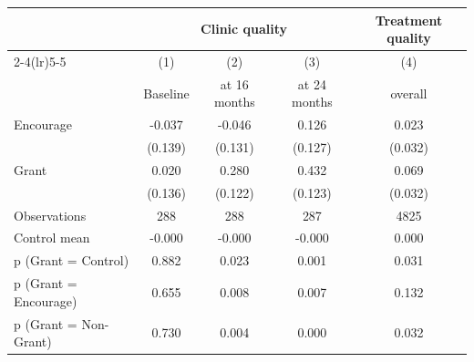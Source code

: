 \begin{tabular*}{\hsize}{@{\hskip\tabcolsep\extracolsep\fill}l*{4}{c}}
\toprule
                    &\multicolumn{3}{c}{Clinic quality}    &\multicolumn{1}{c}{Treatment quality}\\\cmidrule(lr){2-4}\cmidrule(lr){5-5}
                    &\multicolumn{1}{c}{(1)}&\multicolumn{1}{c}{(2)}&\multicolumn{1}{c}{(3)}&\multicolumn{1}{c}{(4)}\\
                    &\multicolumn{1}{c}{Baseline}&\multicolumn{1}{c}{at 16 months}&\multicolumn{1}{c}{at 24 months}&\multicolumn{1}{c}{overall}\\
\midrule
Encourage           &      -0.037&      -0.046&       0.126&       0.023\\
                    &     (0.139)&     (0.131)&     (0.127)&     (0.032)\\
\addlinespace
Grant               &       0.020&       0.280&       0.432&       0.069\\
                    &     (0.136)&     (0.122)&     (0.123)&     (0.032)\\
\midrule
Observations        &         288&         288&         287&        4825\\
Control mean        &      -0.000&      -0.000&      -0.000&       0.000\\
p (Grant = Control) &       0.882&       0.023&       0.001&       0.031\\
p (Grant = Encourage)&       0.655&       0.008&       0.007&       0.132\\
p (Grant = Non-Grant)&       0.730&       0.004&       0.000&       0.032\\
\bottomrule
\end{tabular*}
